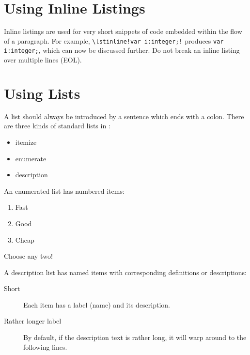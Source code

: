 \section{Using Inline Listings}

Inline listings are used for very short snippets of code embedded
within the flow of a paragraph. For example,
\lstinline|\lstinline!var i:integer;!|
produces
\lstinline!var i:integer;!, which can now be discussed further.
Do not break an inline listing over multiple lines (EOL).




\section{Using Lists}

A list should always be introduced by a sentence
which ends with a colon.
%
There are three kinds of standard lists in \LaTeXe:
\begin{itemize}
\item itemize
\item enumerate
\item description
\end{itemize}
An enumerated list has numbered items:
\begin{enumerate}
\item Fast
\item Good
\item Cheap
\end{enumerate}
Choose any two!


A description list has named items with corresponding
definitions or descriptions:
\begin{description}
\item[Short] Each item has a label (name) and its description.

\item[Rather longer label] By default, if the description text
  is rather long, it will warp around to the following lines.
\end{description}

